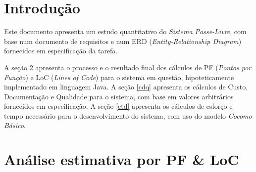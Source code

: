 \documentclass[
10pt, %
a4paper, %
oneside, %
headinclude,footinclude, %
BCOR5mm, %
]{scrartcl}
\begin{document}



\newpage %


\section{Introdução}\label{intro}
Este documento apresenta um estudo quantitativo do \textit{Sistema Passe-Livre},
com base num documento de requisitos e num ERD (\textit{Entity-Relationship Diagram})
fornecidos em especificação da tarefa.

A seção \ref{pfloc} apresenta o processo e o resultado final dos cálculos de PF
(\textit{Pontos por Função}) e LoC (\textit{Lines of Code}) para o sistema em
questão, hipoteticamente implementado em linguagem Java. A seção \ref{cdq}
apresenta os cálculos de Custo, Documentação e Qualidade para o sistema, com
base em valores arbitrários fornecidos em especificação. A seção \ref{etd}
apresenta os cálculos de esforço e tempo necessário para o desenvolvimento do
sistema, com uso do modelo \textit{Cocomo Básico}.

\newpage %


\section{Análise estimativa por PF \& LoC}\label{pfloc}
\end{document}
